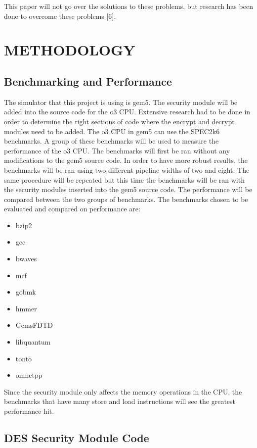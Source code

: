 \documentclass[letterpaper, 10 pt, conference]{ieeeconf}  %
\begin{document}
This paper will not go over the solutions to these problems, but research has been done to overcome these problems [6].  

\section{METHODOLOGY}

\subsection{Benchmarking and Performance}

The simulator that this project is using is gem5. The security module will be added into the source code for the o3 CPU. Extensive research had to be done in order to determine the right sections of code where the encrypt and decrypt modules need to be added.  The o3 CPU in gem5 can use the SPEC2k6 benchmarks.  A group of these benchmarks will be used to measure the performance of the o3 CPU.  The benchmarks will first be ran without any modifications to the gem5 source code.  In order to have more robust results, the benchmarks will be ran using two different pipeline widths of two and eight.  The same procedure will be repeated but this time the benchmarks will be ran with the security modules inserted into the gem5 source code. The performance will be compared between the two groups of benchmarks.  The benchmarks chosen to be evaluated and compared on performance are:

\begin{multicols}{2}
\begin{itemize}
\item bzip2
\item gcc
\item bwaves
\item mcf
\item gobmk
\item hmmer
\item GemsFDTD
\item libquantum
\item tonto
\item omnetpp
\end{itemize}
\end{multicols}

Since the security module only affects the memory operations in the CPU, the benchmarks that have many store and load instructions will see the greatest performance hit.

\subsection{DES Security Module Code}
\end{document}
